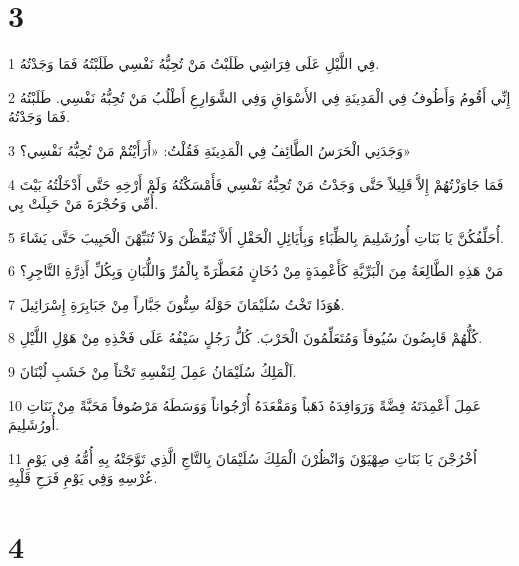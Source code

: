 \chapter{3}

\par 1 فِي اللَّيْلِ عَلَى فِرَاشِي طَلَبْتُ مَنْ تُحِبُّهُ نَفْسِي طَلَبْتُهُ فَمَا وَجَدْتُهُ.
\par 2 إِنِّي أَقُومُ وَأَطُوفُ فِي الْمَدِينَةِ فِي الأَسْوَاقِ وَفِي الشَّوَارِعِ أَطْلُبُ مَنْ تُحِبُّهُ نَفْسِي. طَلَبْتُهُ فَمَا وَجَدْتُهُ.
\par 3 وَجَدَنِي الْحَرَسُ الطَّائِفُ فِي الْمَدِينَةِ فَقُلْتُ: «أَرَأَيْتُمْ مَنْ تُحِبُّهُ نَفْسِي؟»
\par 4 فَمَا جَاوَزْتُهُمْ إِلاَّ قَلِيلاً حَتَّى وَجَدْتُ مَنْ تُحِبُّهُ نَفْسِي فَأَمْسَكْتُهُ وَلَمْ أَرْخِهِ حَتَّى أَدْخَلْتُهُ بَيْتَ أُمِّي وَحُجْرَةَ مَنْ حَبِلَتْ بِي.
\par 5 أُحَلِّفُكُنَّ يَا بَنَاتِ أُورُشَلِيمَ بِالظِّبَاءِ وَبِأَيَائِلِ الْحَقْلِ أَلاَّ تُيَقِّظْنَ وَلاَ تُنَبِّهْنَ الْحَبِيبَ حَتَّى يَشَاءَ.
\par 6 مَنْ هَذِهِ الطَّالِعَةُ مِنَ الْبَرِّيَّةِ كَأَعْمِدَةٍ مِنْ دُخَانٍ مُعَطَّرَةً بِالْمُرِّ وَاللُّبَانِ وَبِكُلِّ أَذِرَّةِ التَّاجِرِ؟
\par 7 هُوَذَا تَخْتُ سُلَيْمَانَ حَوْلَهُ سِتُّونَ جَبَّاراً مِنْ جَبَابِرَةِ إِسْرَائِيلَ.
\par 8 كُلُّهُمْ قَابِضُونَ سُيُوفاً وَمُتَعَلِّمُونَ الْحَرْبَ. كُلُّ رَجُلٍ سَيْفُهُ عَلَى فَخْذِهِ مِنْ هَوْلِ اللَّيْلِ.
\par 9 اَلْمَلِكُ سُلَيْمَانُ عَمِلَ لِنَفْسِهِ تَخْتاً مِنْ خَشَبِ لُبْنَانَ.
\par 10 عَمِلَ أَعْمِدَتَهُ فِضَّةً وَرَوَافِدَهُ ذَهَباً وَمَقْعَدَهُ أُرْجُواناً وَوَسَطَهُ مَرْصُوفاً مَحَبَّةً مِنْ بَنَاتِ أُورُشَلِيمَ.
\par 11 اُخْرُجْنَ يَا بَنَاتِ صِهْيَوْنَ وَانْظُرْنَ الْمَلِكَ سُلَيْمَانَ بِالتَّاجِ الَّذِي تَوَّجَتْهُ بِهِ أُمُّهُ فِي يَوْمِ عُرْسِهِ وَفِي يَوْمِ فَرَحِ قَلْبِهِ.

\chapter{4}

